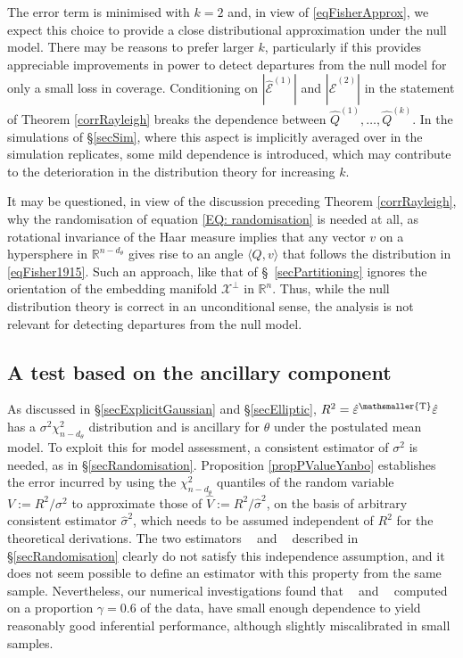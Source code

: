 \documentclass[10pt, reqno]{amsart}
\numberwithin{equation}{section}
\newcommand{\mrcv}{\mathop{\hat{\sigma}^2_{\mathrm{mrcv}}}}
\newcommand{\rcv}{\mathop{\hat{\sigma}^2_{\mathrm{rcv}}}}
\newcommand{\RR}{\mathbb{R}}
\newcommand{\T}{{\mathsmaller {\rm T}}}
\begin{document}
The error term is minimised with $k=2$ and, in view of \eqref{eqFisherApprox}, we expect this choice to provide a close distributional approximation under the null model. There may be reasons to prefer larger $k$, particularly if this provides appreciable improvements in power to detect departures from the null model for only a small loss in coverage. Conditioning on $|\hat{\mathcal{E}}^{(1)}|$ and $|\hat{\mathcal{E}}^{(2)}|$ in the statement of Theorem \ref{corrRayleigh} breaks the dependence between $\hat Q^{(1)},\ldots, \hat Q^{(k)}$. In the simulations of \S \ref{secSim}, where this aspect is implicitly averaged over in the simulation replicates, some mild dependence is introduced, which may contribute to the deterioration in the distribution theory for increasing $k$. 



It may be questioned, in view of the discussion preceding Theorem \ref{corrRayleigh}, why the randomisation of equation \eqref{EQ: randomisation} is needed at all, as rotational invariance of the Haar measure implies that any vector $v$ on a hypersphere in $\RR^{n-d_\theta}$ gives rise to an angle $\langle Q, v \rangle$ that follows the distribution in \eqref{eqFisher1915}. Such an approach, like that of \S~\ref{secPartitioning} ignores the orientation of the embedding manifold $\mathcal{X}^\perp$ in $\RR^n$. Thus, while the null distribution theory is correct in an unconditional sense, the analysis is not relevant for detecting departures from the null model. 



\subsection{A test based on the ancillary component}\label{secAncillaryTest}

As discussed in \S \ref{secExplicitGaussian} and \S \ref{secElliptic}, $R^2 = \hat\varepsilon^\T \hat\varepsilon$ has a $\sigma^2 \chi^2_{n-d_\theta}$ distribution and is ancillary for $\theta$ under the postulated mean model. To exploit this for model assessment, a consistent estimator of $\sigma^2$ is needed, as in \S \ref{secRandomisation}. Proposition \ref{propPValueYanbo} establishes the error incurred by using the $\chi^2_{n-d_\theta}$ quantiles of the random variable $V:=R^2/\sigma^2$ to approximate those of $\hat V:=R^2/\hat\sigma^2$, on the basis of arbitrary consistent estimator $\hat\sigma^2$, which needs to be assumed independent of $R^2$ for the theoretical derivations. The two estimators $\rcv$ and $\mrcv$ described in \S \ref{secRandomisation} clearly do not satisfy this independence assumption, and it does not seem possible to define an estimator with this property from the same sample. Nevertheless, our numerical investigations found that $\rcv$ and $\mrcv$ computed on a proportion $\gamma=0.6$ of the data, have small enough dependence to yield reasonably good inferential performance, although slightly miscalibrated in small samples. 
\end{document}
